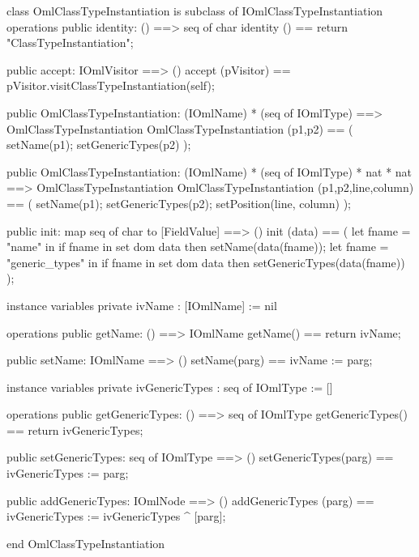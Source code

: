 \begin{vdm_al}
class OmlClassTypeInstantiation is subclass of IOmlClassTypeInstantiation
operations
  public identity: () ==> seq of char
  identity () == return "ClassTypeInstantiation";

  public accept: IOmlVisitor ==> ()
  accept (pVisitor) == pVisitor.visitClassTypeInstantiation(self);

  public OmlClassTypeInstantiation:
    (IOmlName) *
    (seq of IOmlType) ==> OmlClassTypeInstantiation
  OmlClassTypeInstantiation (p1,p2) == 
    ( setName(p1);
      setGenericTypes(p2) );

  public OmlClassTypeInstantiation:
    (IOmlName) *
    (seq of IOmlType) *
    nat *
    nat ==> OmlClassTypeInstantiation
  OmlClassTypeInstantiation (p1,p2,line,column) == 
    ( setName(p1);
      setGenericTypes(p2);
      setPosition(line, column) );

  public init: map seq of char to [FieldValue] ==> ()
  init (data) ==
    ( let fname = "name" in
        if fname in set dom data
        then setName(data(fname));
      let fname = "generic_types" in
        if fname in set dom data
        then setGenericTypes(data(fname)) );

instance variables
  private ivName : [IOmlName] := nil

operations
  public getName: () ==> IOmlName
  getName() == return ivName;

  public setName: IOmlName ==> ()
  setName(parg) == ivName := parg;

instance variables
  private ivGenericTypes : seq of IOmlType := []

operations
  public getGenericTypes: () ==> seq of IOmlType
  getGenericTypes() == return ivGenericTypes;

  public setGenericTypes: seq of IOmlType ==> ()
  setGenericTypes(parg) == ivGenericTypes := parg;

  public addGenericTypes: IOmlNode ==> ()
  addGenericTypes (parg) == ivGenericTypes := ivGenericTypes ^ [parg];

end OmlClassTypeInstantiation
\end{vdm_al}

